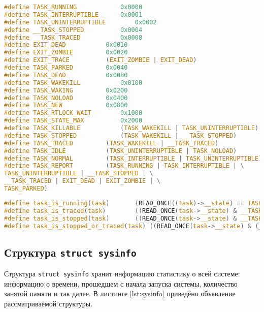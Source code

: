 \begin{lstlisting}[label=lst:states, caption=Описание состояний процесса с помощью макросов, language=c]
#define TASK_RUNNING			0x0000
#define TASK_INTERRUPTIBLE		0x0001
#define TASK_UNINTERRUPTIBLE		0x0002
#define __TASK_STOPPED			0x0004
#define __TASK_TRACED			0x0008
#define EXIT_DEAD			0x0010
#define EXIT_ZOMBIE			0x0020
#define EXIT_TRACE			(EXIT_ZOMBIE | EXIT_DEAD)
#define TASK_PARKED			0x0040
#define TASK_DEAD			0x0080
#define TASK_WAKEKILL			0x0100
#define TASK_WAKING			0x0200
#define TASK_NOLOAD			0x0400
#define TASK_NEW			0x0800
#define TASK_RTLOCK_WAIT		0x1000
#define TASK_STATE_MAX			0x2000
#define TASK_KILLABLE			(TASK_WAKEKILL | TASK_UNINTERRUPTIBLE)
#define TASK_STOPPED			(TASK_WAKEKILL | __TASK_STOPPED)
#define TASK_TRACED			(TASK_WAKEKILL | __TASK_TRACED)
#define TASK_IDLE			(TASK_UNINTERRUPTIBLE | TASK_NOLOAD)
#define TASK_NORMAL			(TASK_INTERRUPTIBLE | TASK_UNINTERRUPTIBLE)
#define TASK_REPORT			(TASK_RUNNING | TASK_INTERRUPTIBLE | \
TASK_UNINTERRUPTIBLE | __TASK_STOPPED | \
__TASK_TRACED | EXIT_DEAD | EXIT_ZOMBIE | \
TASK_PARKED)
\end{lstlisting}

\begin{lstlisting}[label=lst:state-macroses, caption=Макросы\, с помощью которых можно узнать текущее состояние процесса, language=c]
#define task_is_running(task)		(READ_ONCE((task)->__state) == TASK_RUNNING)
#define task_is_traced(task)		((READ_ONCE(task->__state) & __TASK_TRACED) != 0)
#define task_is_stopped(task)		((READ_ONCE(task->__state) & __TASK_STOPPED) != 0)
#define task_is_stopped_or_traced(task)	((READ_ONCE(task->__state) & (__TASK_STOPPED | __TASK_TRACED)) != 0)
\end{lstlisting}

\subsection{Структура \texttt{struct sysinfo}}

Структура \texttt{struct sysinfo} \cite{sysinfo} хранит информацию статистику о всей системе: информацию о времени, прошедшем с начала запуска системы, количество занятой памяти и так далее. В листинге \ref{lst:sysinfo} приведёно объявление рассматриваемой структуры.\\

